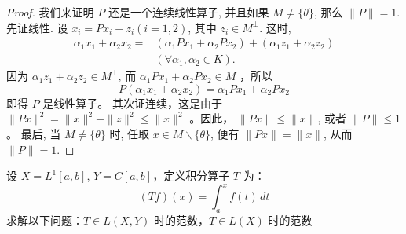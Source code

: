 \documentclass[lang=cn,newtx,10pt,scheme=chinese,thmcnt=chapter]{elegantbook}
\begin{document}
	\begin{proof}
	我们来证明 $P$ 还是一个连续线性算子, 并且如果 $M \neq\{\theta\}$, 那么 $\|P\|=1$.
	先证线性. 设 $x_i=P x_i+z_i(i=1,2)$, 其中 $z_i \in M^{\perp}$. 这时,
	\begin{equation*}
		\begin{aligned}
			\alpha_1 x_1+\alpha_2 x_2= & \left(\alpha_1 P x_1+\alpha_2 P x_2\right)+\left(\alpha_1 z_1+\alpha_2 z_2\right) \\
			& \left(\forall \alpha_1, \alpha_2 \in K \right) .
		\end{aligned}
	\end{equation*}
	因为 $\alpha_1 z_1+\alpha_2 z_2 \in M^{\perp}$, 而 $\alpha_1 P x_1+\alpha_2 P x_2 \in M$ ，所以
	\begin{equation*}
		P\left(\alpha_1 x_1+\alpha_2 x_2\right)=\alpha_1 P x_1+\alpha_2 P x_2
	\end{equation*}
	即得 $P$ 是线性算子。
	其次证连续，这是由于 $\|P x\|^2=\|x\|^2-\|z\|^2 \leqslant\|x\|^2$ 。因此， $\|P x\| \leqslant\|x\|$, 或者 $\|P\| \leqslant 1$ 。
	最后, 当 $M \neq\{\theta\}$ 时, 任取 $x \in M \backslash\{\theta\}$, 便有 $\|P x\|=\|x\|$, 从而 $\|P\|=1$.
	\end{proof}


	
	\begin{example}
		设 ${X} = L^1[a, b]$, ${Y} = C[a, b]$，定义积分算子 $T$ 为：
		\[
		(T f)(x) = \int_a^x f(t) \, dt
		\]
		求解以下问题：\( T \in L({X}, {Y}) \) 时的范数，\( T \in L({X}) \) 时的范数
	\end{example}
\end{document}
